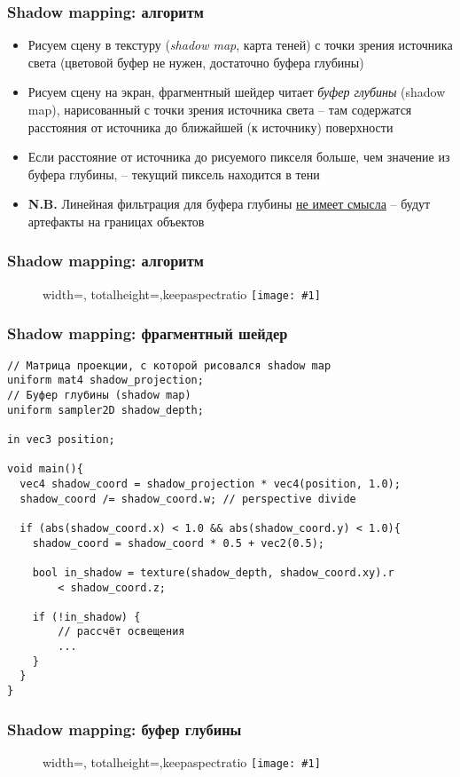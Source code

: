 \documentclass{beamer}
\newcommand{\slideimage}[1]{
  \begin{figure}
    \begin{adjustbox}{width=\textwidth, totalheight=\textheight-2\baselineskip-2\baselineskip,keepaspectratio}
      \texttt{[image: \#1]}
    \end{adjustbox}
  \end{figure}
}
\begin{document}
\begin{frame}[fragile]
\frametitle{Shadow mapping: алгоритм}
\begin{itemize}
\item Рисуем сцену в текстуру (\textit{shadow map}, карта теней) с точки зрения источника света (цветовой буфер не нужен, достаточно буфера глубины)
\pause
\item Рисуем сцену на экран, фрагментный шейдер читает \textit{буфер глубины} (shadow map), нарисованный с точки зрения источника света -- там содержатся расстояния от источника до ближайшей (к источнику) поверхности
\item Если расстояние от источника до рисуемого пикселя больше, чем значение из буфера глубины, -- текущий пиксель находится в тени
\pause
\item \textbf{\alert{N.B.}} Линейная фильтрация для буфера глубины \underline{не имеет смысла} -- будут артефакты на границах объектов
\end{itemize}
\end{frame}

\begin{frame}[fragile]
\frametitle{Shadow mapping: алгоритм}
\slideimage{shadow-mapping1.png}
\end{frame}

\begin{frame}[fragile]
\frametitle{Shadow mapping: фрагментный шейдер}
\begin{verbatim}
// Матрица проекции, с которой рисовался shadow map
uniform mat4 shadow_projection;
// Буфер глубины (shadow map)
uniform sampler2D shadow_depth;

in vec3 position;

void main(){
  vec4 shadow_coord = shadow_projection * vec4(position, 1.0);
  shadow_coord /= shadow_coord.w; // perspective divide

  if (abs(shadow_coord.x) < 1.0 && abs(shadow_coord.y) < 1.0){
    shadow_coord = shadow_coord * 0.5 + vec2(0.5);

    bool in_shadow = texture(shadow_depth, shadow_coord.xy).r
        < shadow_coord.z;

    if (!in_shadow) {
        // рассчёт освещения
        ...
    }
  }
}
\end{verbatim}
\end{frame}

\begin{frame}[fragile]
\frametitle{Shadow mapping: буфер глубины}
\slideimage{shadow-mapping-depth.png}
\end{frame}
\end{document}

